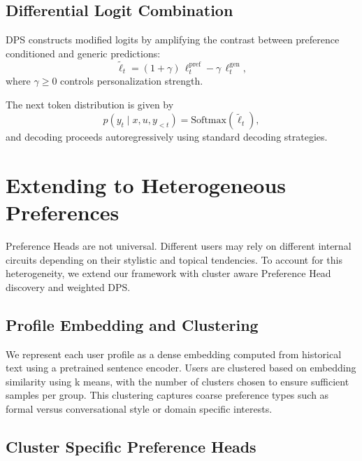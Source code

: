 \documentclass[11pt]{article}
\begin{document}
\subsection{Differential Logit Combination}

DPS constructs modified logits by amplifying the contrast between preference conditioned and generic predictions:
\begin{equation}
\tilde{\ell}_t = (1 + \gamma)\, \ell_t^{\mathrm{pref}} - \gamma \, \ell_t^{\mathrm{gen}},
\end{equation}
where $\gamma \geq 0$ controls personalization strength.

The next token distribution is given by
\begin{equation}
p(y_t \mid x, u, y_{<t}) = \mathrm{Softmax}(\tilde{\ell}_t),
\end{equation}
and decoding proceeds autoregressively using standard decoding strategies.


\section{Extending to Heterogeneous Preferences}
\label{sec:heterogeneous}

Preference Heads are not universal.
Different users may rely on different internal circuits depending on their stylistic and topical tendencies.
To account for this heterogeneity, we extend our framework with cluster aware Preference Head discovery and weighted DPS.



\subsection{Profile Embedding and Clustering}

We represent each user profile as a dense embedding computed from historical text using a pretrained sentence encoder.
Users are clustered based on embedding similarity using k means, with the number of clusters chosen to ensure sufficient samples per group.
This clustering captures coarse preference types such as formal versus conversational style or domain specific interests.





\subsection{Cluster Specific Preference Heads}
\end{document}
